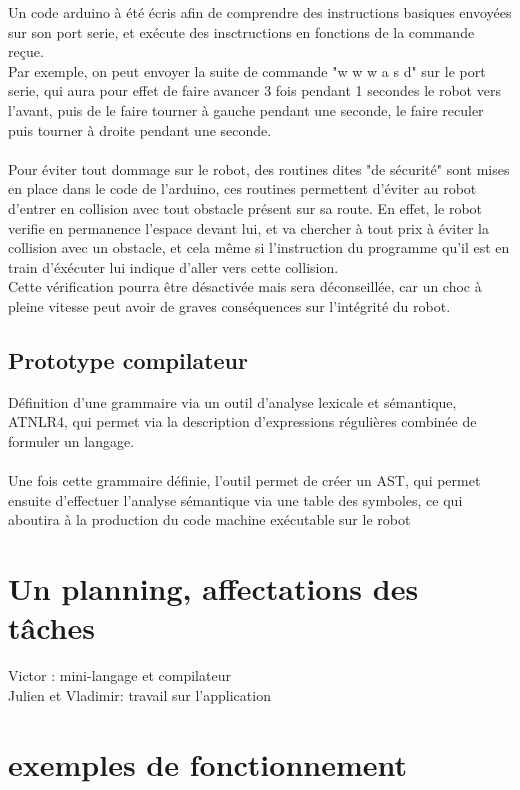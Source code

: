 \documentclass[a4paper]{article}
\begin{document}
Un code arduino à été écris afin de comprendre des instructions basiques envoyées sur son port serie, et exécute des insctructions en fonctions de la commande reçue.\\
Par exemple, on peut envoyer la suite de commande "w w w a s d" sur le port serie, qui aura pour effet de faire avancer 3 fois pendant 1 secondes le robot vers l'avant, puis de le faire tourner à gauche pendant une seconde, le faire reculer puis tourner à droite pendant une seconde.\\

\paragraph{}
Pour éviter tout dommage sur le robot, des routines dites "de sécurité" sont mises en place dans le code de l'arduino, ces routines permettent d'éviter au robot d'entrer en collision avec tout obstacle présent sur sa route. En effet, le robot verifie en permanence l'espace devant lui, et va chercher à tout prix à éviter la collision avec un obstacle, et cela même si l'instruction du programme qu'il est en train d'éxécuter lui indique d'aller vers cette collision.\\
Cette vérification pourra être désactivée mais sera déconseillée, car un choc à pleine vitesse peut avoir de graves conséquences sur l'intégrité du robot.

\subsection{Prototype compilateur}
Définition d’une grammaire via un outil d’analyse lexicale et sémantique, ATNLR4, qui permet via la description d’expressions régulières combinée de formuler un langage.\\
\\
Une fois cette grammaire définie, l’outil permet de créer un AST, qui permet ensuite d’effectuer l’analyse sémantique via une table des symboles, ce qui aboutira à la production du code machine exécutable sur le robot
\section{Un planning, affectations des tâches}

Victor : mini-langage et compilateur\\
Julien et Vladimir: travail sur l’application\\

\section{exemples de fonctionnement}
\end{document}
